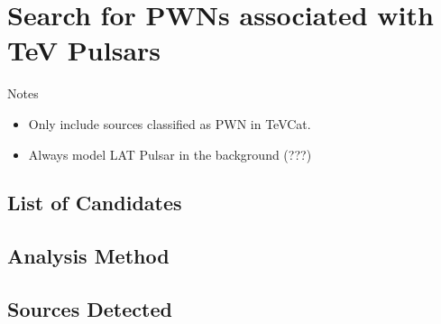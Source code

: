 
\chapter{Search for \acsp{PWN} associated with TeV Pulsars}

Notes 
\begin{itemize}
  \item Only include sources classified as PWN in TeVCat.
  \item Always model LAT Pulsar in the background (???)
\end{itemize}

\section{List of Candidates}

\section{Analysis Method}

\section{Sources Detected}
